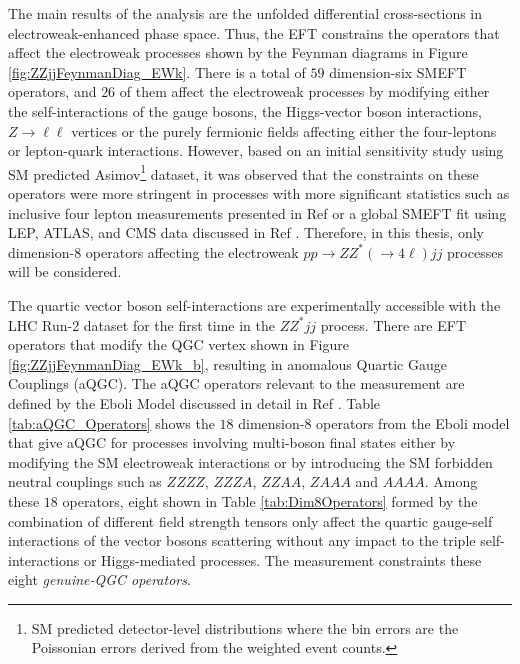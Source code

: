 The main results of the analysis are the unfolded differential cross-sections in electroweak-enhanced phase space. Thus, the EFT constrains the operators that affect the electroweak processes shown by the Feynman diagrams in Figure \ref{fig:ZZjjFeynmanDiag_EWk}. There is a total of $59$ dimension-six SMEFT operators, and $26$ of them affect the electroweak processes by modifying either the self-interactions of the gauge bosons, the Higgs-vector boson interactions, $Z \rightarrow \ell \ell$ vertices or the purely fermionic fields affecting either the four-leptons or lepton-quark interactions. However, based on an initial sensitivity study using SM predicted Asimov\footnote{SM predicted detector-level distributions where the bin errors are the Poissonian errors derived from the weighted event counts.} dataset, it was observed that the constraints on these operators were more stringent in processes with more significant statistics such as inclusive four lepton measurements presented in Ref \cite{Inclusive_FourLepton} or a global SMEFT fit using LEP, ATLAS, and CMS data discussed in Ref \cite{GlobalEFT_Dim6}. Therefore, in this thesis, only dimension-8 operators affecting the electroweak $pp\rightarrow ZZ^* (\rightarrow 4 \ell) jj$ processes will be considered. 

The quartic vector boson self-interactions are experimentally accessible with the LHC Run-2 dataset for the first time in the $ZZ^*jj$ process. There are EFT operators that modify the QGC vertex shown in Figure \ref{fig:ZZjjFeynmanDiag_EWk_b}, resulting in anomalous Quartic Gauge Couplings (aQGC). The aQGC operators relevant to the measurement are defined by the Eboli Model discussed in detail in Ref \cite{EFT_Eboli}. Table \ref{tab:aQGC_Operators} shows the $18$ dimension-8 operators from the Eboli model that give aQGC for processes involving multi-boson final states either by modifying the SM electroweak interactions or by introducing the SM forbidden neutral couplings such as $ZZZZ$, $ZZZA$, $ZZAA$, $ZAAA$ and $AAAA$. Among these $18$ operators, eight shown in Table \ref{tab:Dim8Operators} formed by the combination of different field strength tensors only affect the quartic gauge-self interactions of the vector bosons scattering without any impact to the triple self-interactions or Higgs-mediated processes. The measurement constraints these eight \textit{genuine-QGC operators}. 

